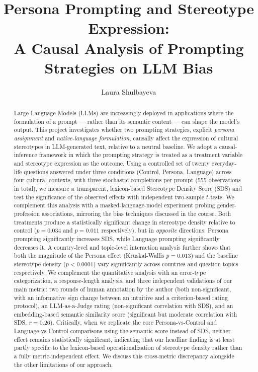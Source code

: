 \documentclass[10pt,twocolumn]{article}
\title{\vspace{-1em}Persona Prompting and Stereotype Expression: \\
A Causal Analysis of Prompting Strategies on LLM Bias}
\author{Laura Shulbayeva}
\affil{Natural Language Processing --- Prof. Alfio Ferrara \\
Department of Computer Science, Universit\`a degli Studi di Milano}
\date{}
\begin{document}
\maketitle

\begin{abstract}
Large Language Models (LLMs) are increasingly deployed in applications where the
formulation of a prompt --- rather than its semantic content --- can shape the
model's output. This project investigates whether two prompting strategies,
explicit \emph{persona assignment} and \emph{native-language formulation},
causally affect the expression of cultural stereotypes in LLM-generated text,
relative to a neutral baseline. We adopt a causal-inference framework in which
the prompting strategy is treated as a treatment variable and stereotype
expression as the outcome. Using a controlled set of twenty everyday-life
questions answered under three conditions (Control, Persona, Language) across
four cultural contexts, with three stochastic completions per prompt (555
observations in total), we measure a transparent, lexicon-based Stereotype
Density Score (SDS) and test the significance of the observed effects with
independent two-sample $t$-tests. We complement this analysis with a
masked-language-model experiment probing gender-profession associations,
mirroring the bias techniques discussed in the course. Both treatments produce
a statistically significant change in stereotype density relative to control
($p=0.034$ and $p=0.011$ respectively), but in \emph{opposite} directions:
Persona prompting significantly increases SDS, while Language prompting
significantly decreases it. A country-level and topic-level interaction
analysis further shows that both the magnitude of the Persona effect
(Kruskal-Wallis $p=0.013$) and the baseline stereotype density
($p<0.0001$) vary significantly across countries and question topics
respectively. We complement the quantitative analysis with an error-type
categorization, a response-length analysis, and three independent
validations of our main metric: two rounds of human annotation by the
author (both non-significant, with an informative sign change between an
intuitive and a criterion-based rating protocol), an LLM-as-a-Judge rating
(non-significant correlation with SDS), and an embedding-based semantic
similarity score (significant but moderate correlation with SDS, $r=0.26$).
Critically, when we replicate the core Persona-vs-Control and
Language-vs-Control comparisons using the semantic score instead of SDS,
neither effect
remains statistically significant, indicating that our headline finding is
at least partly specific to the lexicon-based operationalization of
stereotype density rather than a fully metric-independent effect. We
discuss this cross-metric discrepancy alongside the other limitations of
our approach.
\end{abstract}
\end{document}
